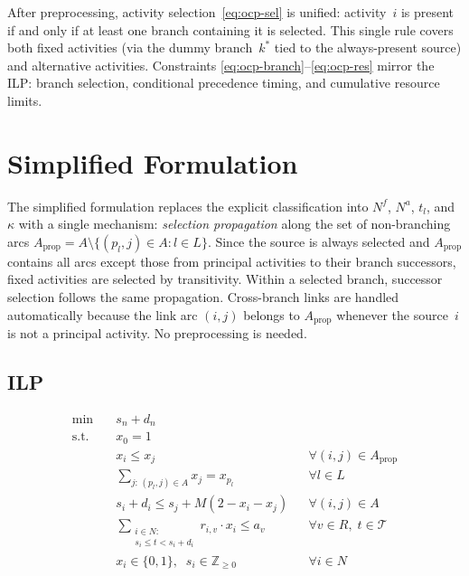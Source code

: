 \documentclass{article}
\begin{document}
\noindent
After preprocessing, activity selection~\eqref{eq:ocp-sel} is unified: activity~$i$ is present if and only if at least one branch containing it is selected. This single rule covers both fixed activities (via the dummy branch~$k^*$ tied to the always-present source) and alternative activities. Constraints \eqref{eq:ocp-branch}--\eqref{eq:ocp-res} mirror the ILP: branch selection, conditional precedence timing, and cumulative resource limits.

\section{Simplified Formulation}

The simplified formulation replaces the explicit classification into $N^f$, $N^a$, $t_l$, and $\kappa$ with a single mechanism: \emph{selection propagation} along the set of non-branching arcs $A_{\mathrm{prop}} = A \setminus \{(p_l, j) \in A : l \in L\}$. Since the source is always selected and $A_{\mathrm{prop}}$ contains all arcs except those from principal activities to their branch successors, fixed activities are selected by transitivity. Within a selected branch, successor selection follows the same propagation. Cross-branch links are handled automatically because the link arc $(i, j)$ belongs to $A_{\mathrm{prop}}$ whenever the source~$i$ is not a principal activity. No preprocessing is needed.

\subsection{ILP}

\begin{align}
\min \quad & s_n + d_n \label{eq:s-obj} \\[2mm]
\text{s.t.} \quad
& x_0 = 1
    \label{eq:s-source} \\
& x_i \le x_j
    && \forall (i,j) \in A_{\mathrm{prop}} \label{eq:s-prop} \\
& \sum_{j:\,(p_l,j) \in A} x_j = x_{p_l}
    && \forall l \in L \label{eq:s-branch} \\
& s_i + d_i \le s_j + M(2 - x_i - x_j)
    && \forall (i,j) \in A \label{eq:s-prec} \\
& \sum_{\substack{i \in N:\\ s_i \le t < s_i\!+\!d_i}} r_{i,v} \cdot x_i \le a_v
    && \forall v \in R,\; t \in \mathcal{T} \label{eq:s-res} \\
& x_i \in \{0,1\},\;\; s_i \in \mathbb{Z}_{\ge 0}
    && \forall i \in N \label{eq:s-var}
\end{align}
\end{document}
